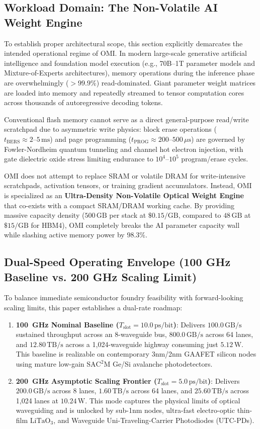 \documentclass[journal]{IEEEtran}
\begin{document}
\subsection{Workload Domain: The Non-Volatile AI Weight Engine}
To establish proper architectural scope, this section explicitly demarcates the intended operational regime of OMI. In modern large-scale generative artificial intelligence and foundation model execution (e.g., 70B--1T parameter models and Mixture-of-Experts architectures), memory operations during the inference phase are overwhelmingly ($>99.9\%$) read-dominated. Giant parameter weight matrices are loaded into memory and repeatedly streamed to tensor computation cores across thousands of autoregressive decoding tokens. 

Conventional flash memory cannot serve as a direct general-purpose read/write scratchpad due to asymmetric write physics: block erase operations ($t_{\text{BERS}} \approx 2\text{--}5\,\text{ms}$) and page programming ($t_{\text{PROG}} \approx 200\text{--}500\,\mu\text{s}$) are governed by Fowler-Nordheim quantum tunneling and channel hot electron injection, with gate dielectric oxide stress limiting endurance to $10^4\text{--}10^5$ program/erase cycles. 

OMI does not attempt to replace SRAM or volatile DRAM for write-intensive scratchpads, activation tensors, or training gradient accumulators. Instead, OMI is specialized as an \textbf{Ultra-Density Non-Volatile Optical Weight Engine} that co-exists with a compact SRAM/DRAM working cache. By providing massive capacity density ($500\,\text{GB}$ per stack at $\$0.15/\text{GB}$, compared to $48\,\text{GB}$ at $\$15/\text{GB}$ for HBM4), OMI completely breaks the AI parameter capacity wall while slashing active memory power by $98.3\%$.

\subsection{Dual-Speed Operating Envelope (100 GHz Baseline vs. 200 GHz Scaling Limit)}
To balance immediate semiconductor foundry feasibility with forward-looking scaling limits, this paper establishes a dual-rate roadmap:
\begin{enumerate}
    \item \textbf{100~GHz Nominal Baseline ($T_{\text{slot}} = 10.0\,\text{ps/bit}$)}: Delivers $100.0\,\text{GB/s}$ sustained throughput across an 8-waveguide bus, $800.0\,\text{GB/s}$ across 64 lanes, and $12.80\,\text{TB/s}$ across a 1,024-waveguide highway consuming just $5.12\,\text{W}$. This baseline is realizable on contemporary 3nm/2nm GAAFET silicon nodes using mature low-gain $\text{SAC}^2\text{M}$ Ge/Si avalanche photodetectors.
    \item \textbf{200~GHz Asymptotic Scaling Frontier ($T_{\text{slot}} = 5.0\,\text{ps/bit}$)}: Delivers $200.0\,\text{GB/s}$ across 8 lanes, $1.60\,\text{TB/s}$ across 64 lanes, and $25.60\,\text{TB/s}$ across 1,024 lanes at $10.24\,\text{W}$. This mode captures the physical limits of optical waveguiding and is unlocked by sub-1nm nodes, ultra-fast electro-optic thin-film $\text{LiTaO}_3$, and Waveguide Uni-Traveling-Carrier Photodiodes (UTC-PDs).
\end{enumerate}
\end{document}

